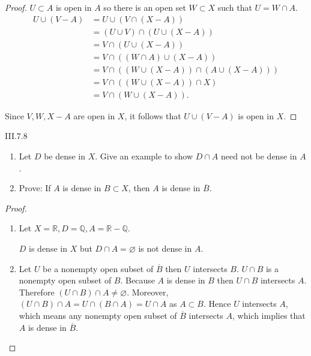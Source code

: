 \begin{proof}
    \( U \subset A \) is open in \(A\) so there is an open set \( W \subset X \) such that \( U = W \cap A \).
    \begingroup
    \allowdisplaybreaks%
    \begin{align*}
        U \cup (V - A) & = U \cup (V \cap (X - A))                         \\
                       & = (U \cup V) \cap (U \cup (X - A))                \\
                       & = V \cap (U \cup (X - A))                         \\
                       & = V \cap ((W \cap A) \cup (X - A))                \\
                       & = V \cap ((W \cup (X - A)) \cap (A \cup (X - A))) \\
                       & = V \cap ((W \cup (X - A)) \cap X)                \\
                       & = V \cap (W \cup (X - A)).
    \end{align*}
    \endgroup

    Since \( V, W, X - A \) are open in \( X \), it follows that \( U \cup (V - A) \) is open in \( X \).
\end{proof}

\begin{problem}{III.7.8}
\begin{enumerate}[label={(\alph*)}]
    \item Let \(D\) be dense in \(X\). Give an example to show \( D \cap A \) need not be dense in \(A\).
    \item Prove: If \(A\) is dense in \(B \subset X\), then \(A\) is dense in \( \overline{B} \).
\end{enumerate}
\end{problem}

\begin{proof}
    \begin{enumerate}[label={(\alph*)}]
        \item Let \( X = \mathbb{R}, D = \mathbb{Q}, A = \mathbb{R} - \mathbb{Q} \).

              \( D \) is dense in \(X\) but \( D \cap A = \varnothing \) is not dense in \( A \).
        \item Let \( U \) be a nonempty open subset of \( \overline{B} \) then \( U \) intersects \( B \). \( U \cap B \) is a nonempty open subset of \( B \). Because \( A \) is dense in \( B \) then \( U \cap B \) intersects \( A \). Therefore \( (U \cap B) \cap A \ne \varnothing \). Moreover, \( (U \cap B) \cap A = U \cap (B \cap A) = U \cap A \) as \( A \subset B \). Hence \( U \) intersects \( A \), which means any nonempty open subset of \( \overline{B} \) intersects \( A \), which implies that \( A \) is dense in \( \overline{B} \).
    \end{enumerate}
\end{proof}

